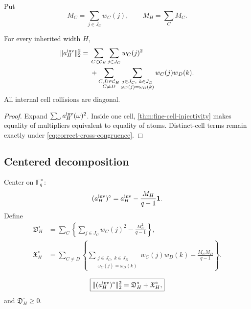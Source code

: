 Put
\[
 M_C=\sum_{j\in J_C}w_C(j),\qquad
 M_H=\sum_C M_C.
\]

\begin{theorem}
\label{thm:correct-collision-energy}
For every inherited width \(H\),
\begin{align}
 \|a_H^{\rm inv}\|_2^2
 ={}&
 \sum_{C\in\mathcal C_H}
 \sum_{j\in J_C}w_C(j)^2
\notag\\
 &+
 \sum_{\substack{C,D\in\mathcal C_H\\C\ne D}}
 \sum_{\substack{j\in J_C,\ k\in J_D\\
                  \omega_C(j)=\omega_D(k)}}
 w_C(j)w_D(k).
\label{eq:correct-uncentered-energy}
\end{align}
All internal cell collisions are diagonal.
\end{theorem}

\begin{proof}
Expand \(\sum_\omega a_H^{\rm inv}(\omega)^2\).
Inside one cell, \cref{thm:fine-cell-injectivity} makes equality of
multipliers equivalent to equality of atoms.  Distinct-cell terms
remain exactly under \eqref{eq:correct-cross-congruence}.
\end{proof}

\subsection{Centered decomposition}

Center on \(\mathbb F_q^\times\):
\[
 (a_H^{\rm inv})^\circ
 =
 a_H^{\rm inv}-\frac{M_H}{q-1}\mathbf 1.
\]
Define
\begin{align}
 \mathfrak D_H^\circ
 &=
 \sum_C
 \left\{
 \sum_{j\in J_C}w_C(j)^2-\frac{M_C^2}{q-1}
 \right\},
\label{eq:correct-diagonal}\\
 \mathfrak X_H^\circ
 &=
 \sum_{C\ne D}
 \left\{
 \sum_{\substack{j\in J_C,\ k\in J_D\\
                  \omega_C(j)=\omega_D(k)}}
 w_C(j)w_D(k)
 -
 \frac{M_CM_D}{q-1}
 \right\}.
\label{eq:correct-cross-energy}
\end{align}

\begin{corollary}
\label{cor:correct-centered-energy}
\begin{equation}
 \boxed{
 \|(a_H^{\rm inv})^\circ\|_2^2
 =
 \mathfrak D_H^\circ+\mathfrak X_H^\circ,}
\label{eq:correct-centered-energy}
\end{equation}
and \(\mathfrak D_H^\circ\ge0\).
\end{corollary}

